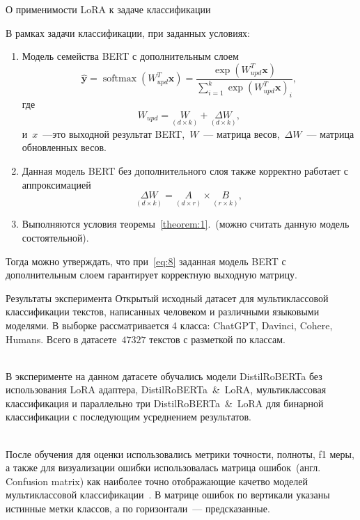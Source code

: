 \documentclass[9pt,pdf,hyperref={unicode}]{beamer}
\begin{document}
\begin{frame}[shrink=5]{О применимости LoRA к задаче классификации}
\justifying
\begin{theorem}
В рамках задачи классификации, при заданных условиях:
\begin{enumerate}
    \item Модель семейства BERT с дополнительным слоем 
    \begin{equation}
    \label{eq:6}
        \hat{\mathbf{y}}=\operatorname{softmax}\left(W_{upd}^T \mathbf{x}\right)=\frac{\exp \left(W_{upd}^T \mathbf{x}\right)}{\sum_{i=1}^k \exp \left(W_{upd}^T \mathbf{x}\right)_i},
    \end{equation}
    где 
    \begin{equation}
    \label{eq:7}
    W_{upd} =\underset{(d \times k) }{W} + \underset{(d \times k)}{\Delta W},
    \end{equation}
    и~$x$~---это выходной результат BERT,~$W$~--- матрица весов,~$\Delta W$~--- матрица обновленных весов.
    \item  Данная модель BERT без дополнительного слоя также корректно работает с аппроксимацией 
    \begin{equation}
    \label{eq:8}
    \underset{(d \times k)}{\Delta W} = \underset{(d \times r)}{ A} \times \underset{(r \times k)}{B},
    \end{equation}
    \item Выполняются условия теоремы~\ref{theorem:1}.~(можно считать данную модель состоятельной).
\end{enumerate}
Тогда можно утверждать, что при~\eqref{eq:8} заданная модель BERT с дополнительным слоем гарантирует корректную выходную матрицу.
\end{theorem}
\end{frame}

\begin{frame}{Результаты эксперимента}
\justifying
Открытый исходный датасет для мультиклассовой классификации текстов, написанных человеком и различными языковыми моделями. В выборке рассматривается 4 класса: ChatGPT, Davinci, Cohere, Humans. Всего в датасете~$47 327$ текстов с разметкой по классам.

~\\
В эксперименте на данном датасете обучались модели DistilRoBERTa без использования LoRA адаптера, DistilRoBERTa~\&~LoRA, мультиклассовая классификация и параллельно три DistilRoBERTa~\&~LoRA для бинарной классификации с последующим усреднением результатов.

~\\
После обучения для оценки использовались метрики точности, полноты, f1 меры, а также для визуализации ошибки использовалась матрица ошибок~(англ. Confusion matrix) как наиболее точно отображающие качетво моделей мультиклассовой классификации~\cite{grandini2020metrics}. В матрице ошибок по вертикали указаны истинные метки классов, а по горизонтали~--- предсказанные.
\end{frame}
\end{document}

